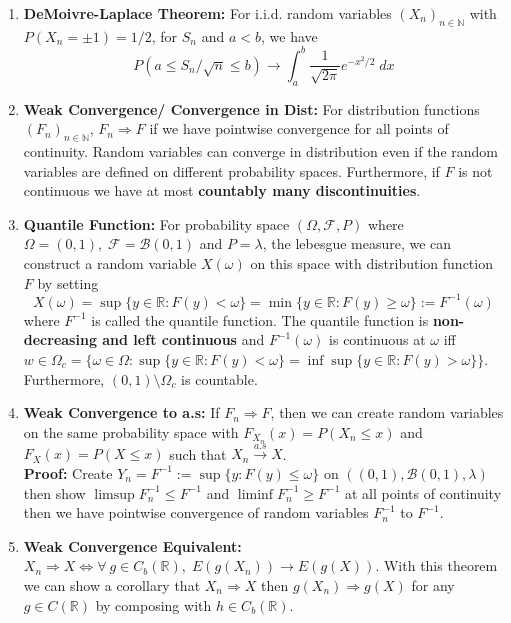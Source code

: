 \documentclass{article}
\begin{document}
\begin{enumerate}
    \item \textbf{DeMoivre-Laplace Theorem:} For i.i.d. random variables \((X_n)_{n\in \mathbb{N}}\) with \(P(X_n = \pm 1) = 1/2\), for \(S_n\) and \(a < b\), we have
    \[
    P(a\leq S_n/\sqrt{n} \leq b) \to \int_a^b \frac{1}{\sqrt{2\pi}}e^{-x^2/2} \;dx
    \]
    
    \item \textbf{Weak Convergence/ Convergence in Dist:} For distribution functions \((F_n)_{n\in \mathbb{N}}\), \(F_n \Rightarrow F\) if we have pointwise convergence for all points of continuity. Random variables can converge in distribution even if the random variables are defined on different probability spaces. Furthermore, if \(F\) is not continuous we have at most \textbf{countably many discontinuities}.

    \item \textbf{Quantile Function:} For probability space \((\Omega, \mathcal{F}, P)\) where \(\Omega = (0,1), \;\mathcal{F} = \mathcal{B}(0,1)\) and \(P =\lambda\), the lebesgue measure, we can construct a random variable \(X(\omega)\) on this space with distribution function \(F\) by setting
    \[
    X(\omega) = \sup \{y \in \mathbb{R}:F(y) <\omega\} = \min \{y \in \mathbb{R} : F(y) \geq \omega\} := F^{-1}(\omega)
    \]
    where \(F^{-1}\) is called the quantile function. The quantile function is
    \textbf{non-decreasing and left continuous} and \(F^{-1}(\omega)\) is continuous at \(\omega\) iff \(w \in \Omega_c = \{\omega\in \Omega:\sup\{y\in \mathbb{R}:F(y) < \omega\} = \inf \sup\{y\in \mathbb{R}:F(y) > \omega\}\}\). Furthermore, \((0,1)\setminus \Omega_c\) is countable.
    
    \item \textbf{Weak Convergence to a.s:} If \(F_n \Rightarrow F\), then we can create random variables on the same probability space with \(F_{X_n}(x) = P(X_n \leq x)\) and \(F_{X}(x) = P(X \leq x)\) such that \(X_n \overset{a.s}{\to} X\).\\

    \textbf{Proof:} Create \(Y_n = F^{-1} := \sup\{y:F(y)\leq \omega\}\) on \(((0,1), \mathcal{B}(0,1), \lambda)\) then show \(\limsup F^{-1}_n \leq F^{-1}\) and \(\liminf F^{-1}_n \geq F^{-1}\) at all points of continuity then we have pointwise convergence of random variables \(F_n^{-1}\) to \(F^{-1}\).

    \item \textbf{Weak Convergence Equivalent:} \(X_n \Rightarrow X \iff \forall \:g \in C_b(\mathbb{R}), \;E(g(X_n)) \to E(g(X))\). With this theorem we can show a corollary that \(X_n \Rightarrow X\) then \(g(X_n) \Rightarrow g(X)\) for any \(g \in C(\mathbb{R})\) by composing with \(h\in C_b(\mathbb{R})\).\\


\end{enumerate}
\end{document}

